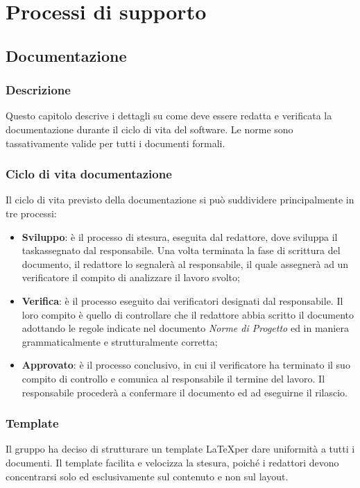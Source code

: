 \section{Processi di supporto}\label{ProcessiSupporto}

\subsection{Documentazione}\label{ProcessiSupporto_Documentazione}

\subsubsection{Descrizione}
Questo capitolo descrive i dettagli su come deve essere redatta e verificata la documentazione durante il ciclo di vita del software. Le norme sono tassativamente valide per tutti i documenti formali.
\subsubsection{Ciclo di vita documentazione}
Il ciclo di vita previsto della documentazione si può suddividere principalmente in tre processi: 
\begin{itemize}
	\item \textbf{Sviluppo}: è il processo di stesura, eseguita dal redattore, dove sviluppa il task\glossario assegnato dal responsabile. Una volta terminata la fase di scrittura del documento, il redattore lo segnalerà al responsabile, il quale assegnerà ad un verificatore il compito di analizzare il lavoro svolto;
 	\item \textbf{Verifica}: è il processo eseguito dai verificatori designati dal responsabile. Il loro compito è quello di controllare che il redattore abbia scritto il documento adottando le regole indicate nel documento \textit{Norme di Progetto} ed in maniera grammaticalmente e strutturalmente corretta;
 	\item \textbf{Approvato}: è il processo conclusivo, in cui il verificatore ha terminato il suo compito di controllo e comunica al responsabile il termine del lavoro. Il responsabile procederà a confermare il documento ed ad eseguirne il rilascio.
\end{itemize} 

\subsubsection{Template}
Il gruppo ha deciso di strutturare un template \LaTeX  per dare uniformità a tutti i documenti. Il template facilita e velocizza la stesura, poiché i redattori devono concentrarsi solo ed esclusivamente sul contenuto e non sul layout.  

